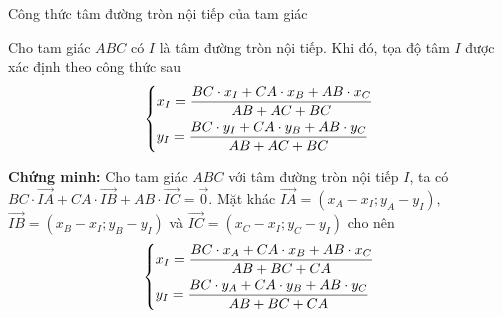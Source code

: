 \begin{dang}{Công thức tâm đường tròn nội tiếp của tam giác}
\begin{minipage}[H]{0.55 \textwidth}
Cho tam giác $ABC$ có $I$ là tâm  đường tròn nội tiếp. Khi đó, tọa độ tâm $I$ được xác định theo công thức sau
\[\left\{\begin{aligned}&x_I=\dfrac{BC \cdot x_I +CA \cdot  x_B+AB\cdot  x_C}{AB+AC+BC}\\ &y_I=\dfrac{BC \cdot y_I +CA \cdot  y_B+AB\cdot  y_C}{AB+AC+BC}\end{aligned}\right.\]
\end{minipage}
\begin{minipage}[H]{0.45 \textwidth}
\begin{center}
\end{center}
\end{minipage}
\end{dang}
\noindent \textbf{Chứng minh:}  Cho tam giác $ABC$ với tâm đường tròn nội tiếp $I$, ta có $BC \cdot \overrightarrow{IA} + CA \cdot \overrightarrow{IB}+AB \cdot \overrightarrow{IC} = \overrightarrow{0}$. Mặt khác
 $\overrightarrow{IA} = \left (x_A-x_I; y_A-y_I\right )$, $\overrightarrow{IB} = \left (x_B-x_I; y_B-y_I\right )$ và $\overrightarrow{IC} = \left (x_C-x_I; y_C-y_I\right )$ cho nên 
 $$\left\{\begin{aligned}&x_I =\dfrac{BC \cdot x_A +CA \cdot x_B + AB \cdot x_C}{AB+BC+CA}\\&y_I=\dfrac{BC \cdot y_A +CA \cdot y_B + AB \cdot y_C}{AB+BC+CA} \end{aligned}\right.$$


